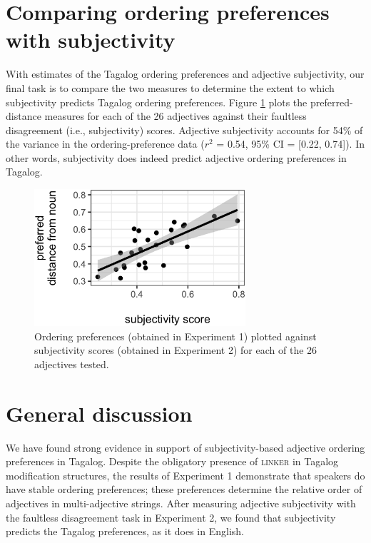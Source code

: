 \documentclass[12pt,letterpaper]{article}
\begin{document}
\section{Comparing ordering preferences with subjectivity} \label{comparison}

With estimates of the Tagalog ordering preferences and adjective subjectivity, our final task is to compare the two measures to determine the extent to which subjectivity predicts Tagalog ordering preferences. Figure \ref{subj-comparison} plots the preferred-distance measures for each of the 26 adjectives against their faultless disagreement (i.e., subjectivity) scores. Adjective subjectivity accounts for 54\% of the variance in the ordering-preference data ($r^2$ = 0.54, 95\% CI = [0.22, 0.74]). In other words, subjectivity does indeed predict adjective ordering preferences in Tagalog.


\begin{figure}[t]
\centering
\includegraphics[height=2in]{LSA-naturalness-subjectivity.eps}
\caption{Ordering preferences (obtained in Experiment 1) plotted against subjectivity scores (obtained in Experiment 2) for each of the 26 adjectives tested. %
}
\label{subj-comparison}
\end{figure}


\section{General discussion} \label{discussion}

We have found strong evidence in support of subjectivity-based adjective ordering preferences in Tagalog. Despite the obligatory presence of \textsc{linker} in Tagalog modification structures, the results of Experiment 1 demonstrate that speakers do have stable ordering preferences; these preferences determine the relative order of adjectives in multi-adjective strings. After measuring adjective subjectivity with the faultless disagreement task in Experiment 2, we found that subjectivity predicts the Tagalog preferences, as it does in English. 
\end{document}
